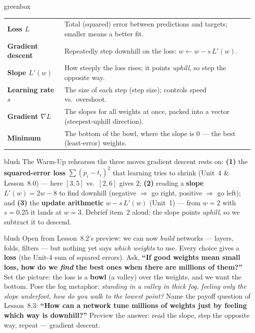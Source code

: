 \documentclass[10pt]{article}
\begin{document}
\begin{skillbox}{greenbox}
\renewcommand{\arraystretch}{1.3}
\begin{tabularx}{\linewidth}{@{}l X@{}}
\textbf{Loss $L$} & Total (squared) error between predictions and targets; smaller means a better fit. \\
\textbf{Gradient descent} & Repeatedly step downhill on the loss: $w\leftarrow w-s\,L'(w)$. \\
\textbf{Slope $L'(w)$} & How steeply the loss rises; it points \emph{uphill}, so step the opposite way. \\
\textbf{Learning rate $s$} & The size of each step (step size); controls speed vs.\ overshoot. \\
\textbf{Gradient $\nabla L$} & The slopes for all weights at once, packed into a vector (steepest-uphill direction). \\
\textbf{Minimum} & The bottom of the bowl, where the slope is $0$ --- the best (least-error) weights. \\
\end{tabularx}
\end{skillbox}

\begin{fixedskillbox}{blush}
    The Warm-Up rehearses the three moves gradient descent rests on: \textbf{(1)} the \textbf{squared-error
    loss} $\sum(p_i-t_i)^2$ that learning tries to shrink (Unit~4 \& Lesson~8.0) --- here $[3,5]$ vs.\ $[2,6]$
    gives $2$; \textbf{(2)} reading a \textbf{slope} $L'(w)=2w-8$ to find downhill (negative $\Rightarrow$ go
    right, positive $\Rightarrow$ go left); and \textbf{(3)} the \textbf{update arithmetic}
    $w-s\,L'(w)$ (Unit~1) --- from $w=2$ with $s=0.25$ it lands at $w=3$. Debrief item~2 aloud: the slope points
    \emph{uphill}, so we subtract it to descend.
\end{fixedskillbox}

\begin{skillbox}[Hook]{blush}
    Open from Lesson~8.2's preview: we can now \emph{build} networks --- layers, folds, filters --- but nothing
    yet says \emph{which weights} to use. Every choice gives a \textbf{loss} (the Unit-4 sum of squared errors).
    Ask, \textbf{``If good weights mean small loss, how do we \emph{find} the best ones when there are millions
    of them?''} Set the picture: the loss is a \textbf{bowl} (a valley) over the weights, and we want the
    bottom. Pose the fog metaphor: \emph{standing in a valley in thick fog, feeling only the slope underfoot,
    how do you walk to the lowest point?} Name the payoff question of Lesson~8.3: \textbf{``How can a network
    tune millions of weights just by feeling which way is downhill?''} Preview the answer: read the slope, step
    the opposite way, repeat --- gradient descent.
\end{skillbox}
\end{document}
